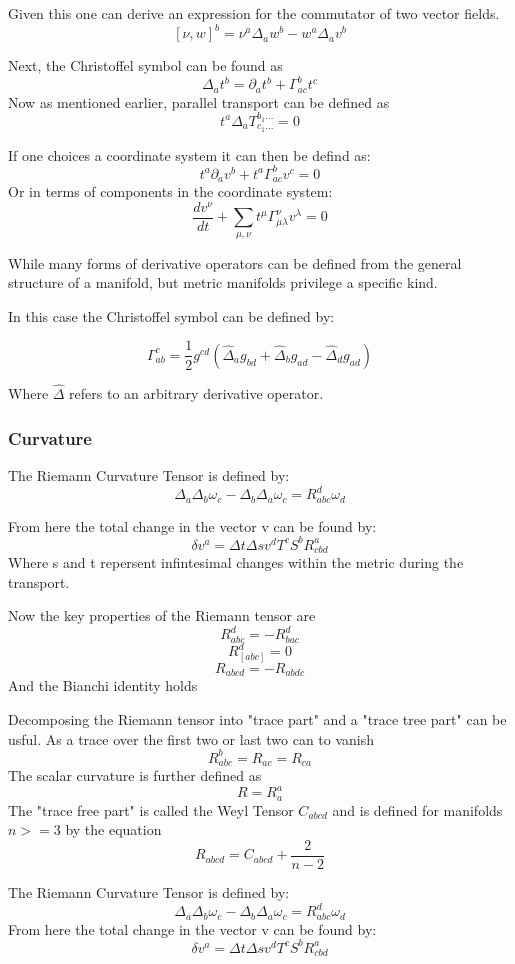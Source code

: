 Given this one can derive an expression for the commutator of two vector fields.
\[
    [\nu, w]^b = \nu^a \Delta_a w^b - w^a \Delta_a v^b
  \]

  Next, the Christoffel symbol can be found as
\[
\Delta_a t^b = \partial_a t^b + \Gamma^b_{ac}t^c
  \]
  Now as mentioned earlier, parallel transport can be defined as
\[
t^a \Delta_a T^{b_1...}_{c_1...}=0
  \]

  If one choices a coordinate system it can then be defind as:
\[
t^a \partial_a v^b + t^a \Gamma^b_{ac}v^c = 0
  \]
  Or in terms of components in the coordinate system:
\[
\frac{dv^\nu}{dt} + \sum_{\mu , \nu} t^\mu \Gamma^\nu_{\mu \lambda}v^\lambda = 0
  \]

  While many forms of derivative operators can be defined from the general structure of a manifold, but metric manifolds privilege a specific kind.

  In this case the Christoffel symbol can be defined by:

\[
  \Gamma^c_{ab} = \frac 12 g^{cd}\left(\hat{\Delta}_a g_{bd}+ \hat{\Delta}_b g_{ad} - \hat{\Delta}_d g_{ad} \right)
  \]

  Where $\hat{\Delta}$ refers to an arbitrary derivative operator.

\subsubsection{Curvature}

The Riemann Curvature Tensor is defined by:
\[
\Delta_a \Delta_b \omega_c - \Delta_b \Delta_a \omega_c = R_{abc}^d \omega_d
  \]

  From here the total change in the vector v can be found by:
\[
\delta v^a = \Delta t \Delta s v^d T^c S^b R_{cbd}^a
  \]
  Where s and t repersent infintesimal changes within the metric during the transport.

  Now the key properties of the Riemann tensor are
\[
R_{abc}^d = - R_{bac}^d
\]
\[
R_{[abc]}^d = 0
\]
\[
R_{abcd}=-R_{abdc}
\]
And the Bianchi identity holds

Decomposing the Riemann tensor into "trace part" and a "trace tree part" can be usful. As a trace over the first two or last two can to vanish
\[
R_{abc}^b=R_{ac}=R_{ca}
\]
The scalar curvature is further defined as
\[
R=R_a^a
\]
The "trace free part" is called the Weyl Tensor $C_{abcd}$ and is defined for manifolds $n >= 3$ by the equation
\[
R_{abcd}= C_{abcd} + \frac{2}{n-2}
\]

The Riemann Curvature Tensor is defined by:
\[
  \Delta_a \Delta_b \omega_c - \Delta_b \Delta_a \omega_c = R_{abc}^d \omega_d
\]
From here the total change in the vector v can be found by:
\[
\delta v^a = \Delta t \Delta s v^d T^c S^b R_{cbd}^a
  \]


